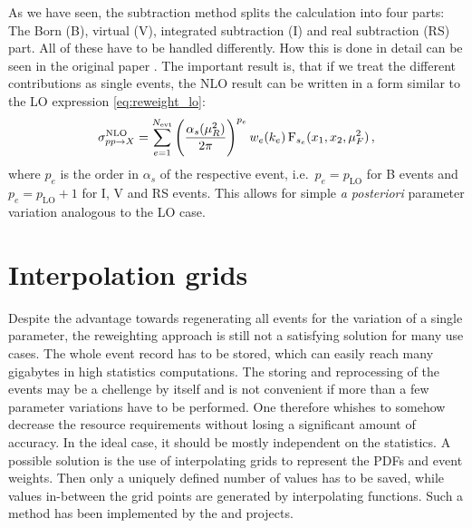 As we have seen, the subtraction method splits the calculation into four parts: The Born (B), virtual (V), integrated subtraction (I) and real subtraction (RS) part.
All of these have to be handled differently.
How this is done in detail can be seen in the original \mcgrid{} paper \cite{mcgrid2013}.
The important result is, that if we treat the different contributions as single events, the NLO result can be written in a form similar to the LO expression \eqref{eq:reweight_lo}:
%
\begin{equation}
  \sigma^\text{NLO}_{pp \rightarrow X} = \sum_{e=1}^{N_\text{evt}} \left( \frac{\alpha_s(\mu_R^2)}{2 \pi} \right)^{p_e} w_e(k_e) \operatorname{F}_{s_e}(x_1,x_2,\mu_F^2) \, ,
  \label{eq:reweight_nlo}
\end{equation}
%
where $p_e$ is the order in $\alpha_s$ of the respective event, i.e.\ $p_e = p_\text{LO}$ for B events and $p_e = p_\text{LO} + 1$ for I, V and RS events.
This allows for simple \textit{a posteriori} parameter variation analogous to the LO case.
%
\section{Interpolation grids}
Despite the advantage towards regenerating all events for the variation of a single parameter, the reweighting approach is still not a satisfying solution for many use cases.
The whole event record has to be stored, which can easily reach many gigabytes in high statistics computations.
The storing and reprocessing of the events may be a chellenge by itself and is not convenient if more than a few parameter variations have to be performed.
One therefore whishes to somehow decrease the resource requirements without losing a significant amount of accuracy.
In the ideal case, it should be mostly independent on the statistics.
A possible solution is the use of interpolating grids to represent the PDFs and event weights.
Then only a uniquely defined number of values has to be saved, while values in-between the grid points are generated by interpolating functions.
Such a method has been implemented by the \appl{} \cite{applgrid2010} and \fnlo{} \cite{fastnlo2006,fastnlo2011} projects.

